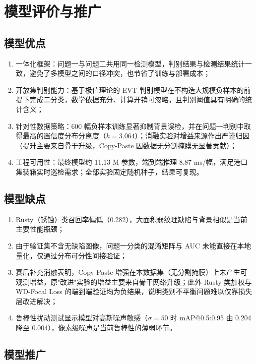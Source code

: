 \section{模型评价与推广}

\subsection{模型优点}

\begin{enumerate}[leftmargin=2.2em,itemsep=2pt]
  \item {\heiti 一体化框架：}问题一与问题二共用同一检测模型，判别结果与检测结果统计一致，避免了多模型之间的口径冲突，也节省了训练与部署成本；
  \item {\heiti 开放集判别能力：}基于极值理论的 EVT 判别模型在不构造大规模负样本的前提下完成二分类，数学依据充分、计算开销可忽略，且判别阈值具有明确的统计含义；
  \item {\heiti 针对性数据策略：}600 幅负样本训练显著抑制背景误检，并在问题一判别中取得最高的置信度分布分离度（$k=3.064$）；消融实验对增益来源作出严谨归因（提升主要来自骨干升级，Copy-Paste 因数据无分割掩膜无显著贡献）；
  \item {\heiti 工程可用性：}最终模型约 11.13 M 参数，端到端推理 8.87 ms/幅，满足港口集装箱实时巡检需求；全部实验固定随机种子，结果可复现。
\end{enumerate}

\subsection{模型缺点}

\begin{enumerate}[leftmargin=2.2em,itemsep=2pt]
  \item Rusty（锈蚀）类召回率偏低（0.282），大面积弱纹理缺陷与背景相似是当前主要性能瓶颈；
  \item 由于验证集不含无缺陷图像，问题一分类的混淆矩阵与 AUC 未能直接在本地量化，仅通过分布可分性间接验证；
  \item 赛后补充消融表明，Copy-Paste 增强在本数据集（无分割掩膜）上未产生可观测增益，原"改进"实验的增益主要来自骨干网络升级；此外 Rusty 类加权与 WD-Focal Loss 的端到端验证均为负结果，说明类别不平衡问题难以仅靠损失层改进解决；
  \item 鲁棒性扰动测试显示模型对高斯噪声敏感（$\sigma=50$ 时 mAP@0.5:0.95 由 0.204 降至 0.004），像素级噪声是当前鲁棒性的薄弱环节。
\end{enumerate}

\subsection{模型推广}

